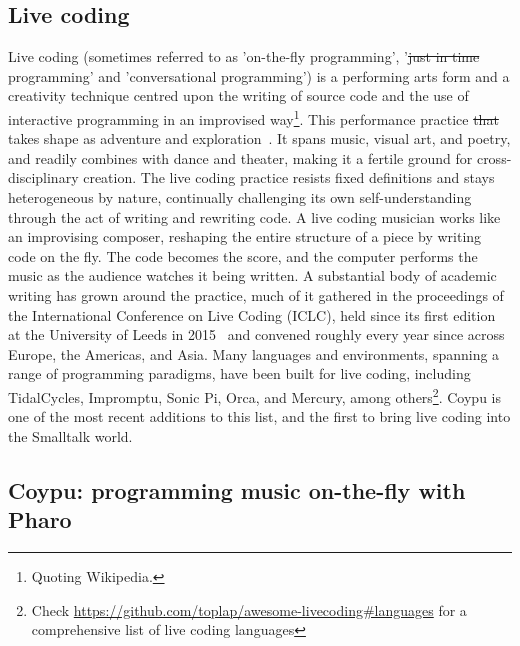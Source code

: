 \documentclass[
]{ceurart}
\providecommand{\DIFadd}[1]{{\protect\color{blue}\uwave{#1}}} %
\providecommand{\DIFdel}[1]{{\protect\color{red}\sout{#1}}} %
\providecommand{\DIFaddbegin}{} %
\providecommand{\DIFaddend}{} %
\providecommand{\DIFdelbegin}{} %
\providecommand{\DIFdelend}{} %
\newcommand{\DIFscaledelfig}{0.5}
\newlength{\DIFdelgraphicswidth} %
\newlength{\DIFdelgraphicsheight} %
\newcommand{\DIFaddincludegraphics}[2][]{{\color{blue}\fbox{\DIFOincludegraphics[#1]{#2}}}} %
\newcommand{\DIFdelincludegraphics}[2][]{%
\sbox{\DIFdelgraphicsbox}{\DIFOincludegraphics[#1]{#2}}%
\settoboxwidth{\DIFdelgraphicswidth}{\DIFdelgraphicsbox} %
\settoboxtotalheight{\DIFdelgraphicsheight}{\DIFdelgraphicsbox} %
\scalebox{\DIFscaledelfig}{%
\parbox[b]{\DIFdelgraphicswidth}{\usebox{\DIFdelgraphicsbox}\\[-\baselineskip] \rule{\DIFdelgraphicswidth}{0em}}\llap{\resizebox{\DIFdelgraphicswidth}{\DIFdelgraphicsheight}{%
\setlength{\unitlength}{\DIFdelgraphicswidth}%
\begin{picture}(1,1)%
\thicklines\linethickness{2pt} %
{\color[rgb]{1,0,0}\put(0,0){\framebox(1,1){}}}%
{\color[rgb]{1,0,0}\put(0,0){\line( 1,1){1}}}%
{\color[rgb]{1,0,0}\put(0,1){\line(1,-1){1}}}%
\end{picture}%
}\hspace*{3pt}}} %
} %
\DeclareRobustCommand{\DIFaddbegin}{\DIFOaddbegin \let\includegraphics\DIFaddincludegraphics} %
\DeclareRobustCommand{\DIFaddend}{\DIFOaddend \let\includegraphics\DIFOincludegraphics} %
\DeclareRobustCommand{\DIFdelbegin}{\DIFOdelbegin \let\includegraphics\DIFdelincludegraphics} %
\DeclareRobustCommand{\DIFdelend}{\DIFOaddend \let\includegraphics\DIFOincludegraphics} %
\begin{document}
\subsection{Live coding}
Live coding (sometimes referred to as 'on-the-fly programming', '\DIFdelbegin \DIFdel{just in time }\DIFdelend \DIFaddbegin \DIFadd{just-in-time }\DIFaddend programming' and 'conversational programming') is a performing arts form and a creativity technique centred upon the writing of source code and the use of interactive programming in an improvised way\footnote{Quoting Wikipedia.}. This performance practice \DIFdelbegin \DIFdel{that }\DIFdelend takes shape as adventure and exploration~\cite{Blac22a}. It spans music, visual art, and poetry, and readily combines with dance and theater, making it a fertile ground for cross-disciplinary creation. The live coding practice resists fixed definitions and stays heterogeneous by nature, continually challenging its own self-understanding through the act of writing and rewriting code.
A live coding musician works like an improvising composer, reshaping the entire structure of a piece by writing code on the fly. The code becomes the score, and the computer performs the music as the audience watches it being written.
A substantial body of academic writing has grown around the practice, much of it gathered in the proceedings of the International Conference on Live Coding (ICLC), held since its first edition at the University of Leeds in 2015~\cite{McLe15a} and convened roughly every year since across Europe, the Americas, and Asia.
Many languages and environments, spanning a range of programming paradigms, have been built for live coding, including TidalCycles, Impromptu, Sonic Pi, Orca, and Mercury, among others\footnote{Check \url{https://github.com/toplap/awesome-livecoding\#languages} for a comprehensive list of live coding languages}. Coypu is one of the most recent additions to this list, and the first to bring live coding into the Smalltalk world.
\DIFaddbegin 

\DIFaddend \subsection{Coypu: programming music on-the-fly with Pharo}
\end{document}
